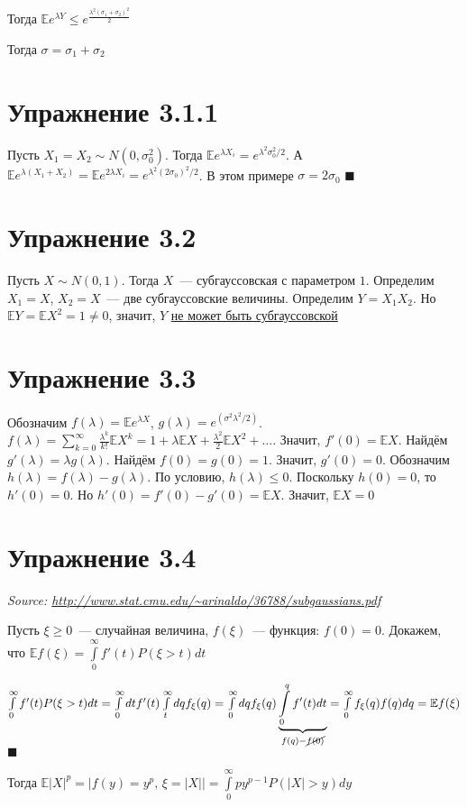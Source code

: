 \documentclass[a4paper]{article}
\begin{document}
Тогда $\mathbb{E}e^{\lambda Y}\leqslant e^{\frac{\lambda^2(\sigma_1+\sigma_2)^2}{2}}$

Тогда $\boxed{\sigma=\sigma_1+\sigma_2}$
\section*{Упражнение 3.1.1}
Пусть $X_1=X_2\sim N(0,\sigma_0^2)$. Тогда $\mathbb{E}e^{\lambda X_i}=e^{\lambda^2\sigma_0^2/2}$. А $\mathbb{E}e^{\lambda (X_1+X_2)}=\mathbb{E}e^{2\lambda X_i}=e^{\lambda^2(2\sigma_0)^2/2}$. В этом примере $\sigma=2\sigma_0$ $\blacksquare$
\section*{Упражнение 3.2}
Пусть $X\sim N(0,1)$. Тогда $X$~--- субгауссовская с параметром $1$. Определим $X_1=X$, $X_2=X$~--- две субгауссовские величины. Определим $Y=X_1X_2$. Но $\mathbb{E}Y=\mathbb{E}X^2=1\neq 0$, значит, $Y$ \underline{не может быть субгауссовской}
\section*{Упражнение 3.3}
Обозначим $f(\lambda)=\mathbb{E}e^{\lambda X}$, $g(\lambda)=e^(\sigma^2\lambda^2/2)$. $f(\lambda)=\sum\limits_{k=0}^\infty \frac{\lambda^k}{k!}\mathbb{E}X^k=1+\lambda \mathbb{E}X+\frac{\lambda^2}{2}\mathbb{E}X^2+...$. Значит, $f'(0)=\mathbb{E}X$. Найдём $g'(\lambda)=\lambda g(\lambda)$. Найдём $f(0)=g(0)=1$. Значит, $g'(0)=0$. Обозначим $h(\lambda)=f(\lambda)-g(\lambda)$. По условию, $h(\lambda)\leqslant 0$. Поскольку $h(0)=0$, то $h'(0)=0$. Но $h'(0)=f'(0)-g'(0)=\mathbb{E}X$. Значит, $\boxed{\mathbb{E}X=0}$
\section*{Упражнение 3.4}
{\em Source: \url{http://www.stat.cmu.edu/~arinaldo/36788/subgaussians.pdf}}

Пусть $\xi\geqslant 0$~--- случайная величина, $f(\xi)$~--- функция: $f(0)=0$. Докажем, что $\mathbb{E}f(\xi)=\int\limits_0^\infty f'(t)P(\xi>t)dt$

$\int\limits_0^\infty f'(t)P(\xi>t)dt=\int\limits_0^\infty dtf'(t)\int\limits_t^\infty dq f_\xi(q)=\int\limits_0^\infty dq f_\xi(q)\underbrace{\int\limits_0^qf'(t)dt}_{f(q)-\cancel{f(0)}}=\int\limits_0^\infty f_{\xi}(q)f(q)dq=\mathbb{E}f(\xi)$ $\blacksquare$

Тогда $\mathbb{E}|X|^p=\big|f(y)=y^p,\,\xi=|X|\big|=\int\limits_0^\infty py^{p-1}P(|X|>y)dy$
\end{document}
